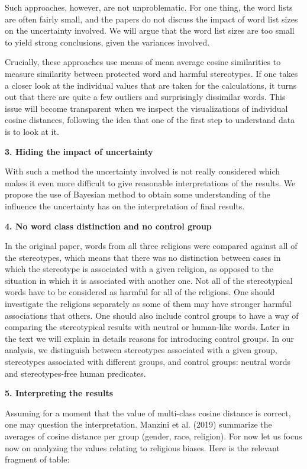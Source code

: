 \documentclass[10pt,dvipsnames,enabledeprecatedfontcommands]{scrartcl}
\begin{document}
Such approaches, however, are not unproblematic. For one thing, the word
lists are often fairly small, and the papers do not discuss the impact
of word list sizes on the uncertainty involved. We will argue that the
word list sizes are too small to yield strong conclusions, given the
variances involved.

Crucially, these approaches use means of mean average cosine
similarities to measure similarity between protected word and harmful
stereotypes. If one takes a closer look at the individual values that
are taken for the calculations, it turns out that there are quite a few
outliers and surprisingly dissimilar words. This issue will become
transparent when we inspect the visualizations of individual cosine
distances, following the idea that one of the first step to understand
data is to look at it.

\textbf{3. Hiding the impact of uncertainty}

With such a method the uncertainty involved is not really considered
which makes it even more difficult to give reasonable interpretations of
the results. We propose the use of Bayesian method to obtain some
understanding of the influence the uncertainty has on the interpretation
of final results.

\textbf{4. No word class distinction and no control group}

In the original paper, words from all three religions were compared
against all of the stereotypes, which means that there was no
distinction between cases in which the stereotype is associated with a
given religion, as opposed to the situation in which it is associated
with another one. Not all of the stereotypical words have to be
considered as harmful for all of the religions. One should investigate
the religions separately as some of them may have stronger harmful
associations that others. One should also include control groups to have
a way of comparing the stereotypical results with neutral or human-like
words. Later in the text we will explain in details reasons for
introducing control groups. In our analysis, we distinguish between
stereotypes associated with a given group, stereotypes associated with
different groups, and control groups: neutral words and stereotypes-free
human predicates.

\textbf{5. Interpreting the results}

Assuming for a moment that the value of multi-class cosine distance is
correct, one may question the interpretation. Manzini et al. (2019)
summarize the averages of cosine distance per group (gender, race,
religion). For now let us focus now on analyzing the values relating to
religious biases. Here is the relevant fragment of table:
\end{document}
